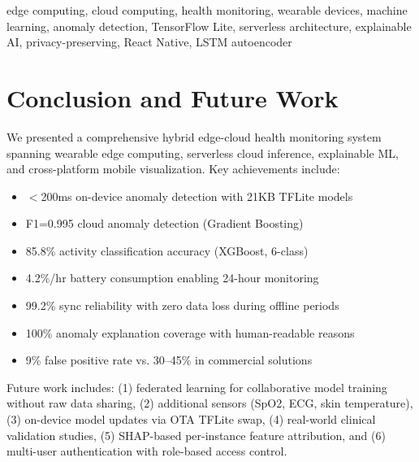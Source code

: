 \documentclass[journal]{IEEEtran}
\begin{document}
\begin{IEEEkeywords}
edge computing, cloud computing, health monitoring, wearable devices, machine learning, anomaly detection, TensorFlow Lite, serverless architecture, explainable AI, privacy-preserving, React Native, LSTM autoencoder
\end{IEEEkeywords}












\section{Conclusion and Future Work}
We presented a comprehensive hybrid edge-cloud health monitoring system spanning wearable edge computing, serverless cloud inference, explainable ML, and cross-platform mobile visualization. Key achievements include:

\begin{itemize}
    \item $<$200ms on-device anomaly detection with 21KB TFLite models
    \item F1=0.995 cloud anomaly detection (Gradient Boosting)
    \item 85.8\% activity classification accuracy (XGBoost, 6-class)
    \item 4.2\%/hr battery consumption enabling 24-hour monitoring
    \item 99.2\% sync reliability with zero data loss during offline periods
    \item 100\% anomaly explanation coverage with human-readable reasons
    \item 9\% false positive rate vs. 30--45\% in commercial solutions
\end{itemize}

Future work includes: (1) federated learning for collaborative model training without raw data sharing, (2) additional sensors (SpO2, ECG, skin temperature), (3) on-device model updates via OTA TFLite swap, (4) real-world clinical validation studies, (5) SHAP-based per-instance feature attribution, and (6) multi-user authentication with role-based access control.
\end{document}
